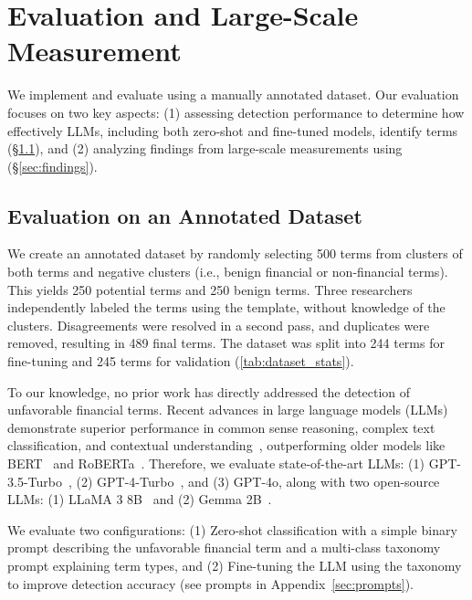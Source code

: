 
\section{Evaluation and Large-Scale Measurement}





We implement and evaluate \platform using a manually annotated dataset. Our evaluation focuses on two key aspects: (1) assessing detection performance to determine how effectively LLMs, including both zero-shot and fine-tuned models, identify \termname terms (\S\ref{sec:eva}), and (2) analyzing findings from large-scale measurements using \platform (\S\ref{sec:findings}).



\subsection{Evaluation on an Annotated Dataset}
\label{sec:eva}

 We create an annotated dataset by randomly selecting 500 terms from clusters of both \termname terms and negative clusters (i.e., benign financial or non-financial terms). This yields 250 potential \termname terms and 250 benign terms. Three researchers independently labeled the terms using the \termname template, without knowledge of the clusters. Disagreements were resolved in a second pass, and duplicates were removed, resulting in 489 final terms. The dataset was split into 244 terms for fine-tuning and 245 terms for validation (\autoref{tab:dataset_stats}). 


To our knowledge, no prior work has directly addressed the detection of unfavorable financial terms. Recent advances in large language models (LLMs) demonstrate superior performance in common sense reasoning, complex text classification, and contextual understanding~\citep{gpt35,openai2023gpt4,touvron2023llama}, outperforming older models like BERT~\citep{devlin2018bert} and RoBERTa~\citep{liu2019roberta}. Therefore, we evaluate state-of-the-art LLMs: (1) GPT-3.5-Turbo~\citep{gpt35}, (2) GPT-4-Turbo~\citep{openai2023gpt4}, and (3) GPT-4o, along with two open-source LLMs: (1) LLaMA 3 8B~\citep{touvron2023llama} and (2) Gemma 2B~\citep{team2024gemma}.


We evaluate two configurations: (1) Zero-shot classification with a simple binary prompt describing the unfavorable financial term and a multi-class taxonomy prompt explaining term types, and (2) Fine-tuning the LLM using the taxonomy to improve detection accuracy (see prompts in Appendix~\ref{sec:prompts}).





